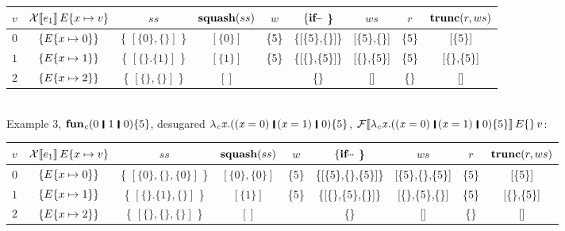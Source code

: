 \begin{tabular}{|c|c|c|c|c|c|c|c|c|}
  \hline
  $v$ & $\mathcal{X}\llbracket e_1 \rrbracket\, E\{  x \mapsto v \} $ & \mbox{ $ss$ } & $\textbf{squash}(ss)$ & $w$ & $ \{ \ensuremath{\textbf{if}} \mydots$ \} & $ws$ & $r$ & $\textbf{trunc}(r,ws)$\\
  \hline
  $0$ & $\{ E\{  x \mapsto 0  \} \}$ & \{ $[\{0\},\{\}]$ \} & $[\{0\}]$ & \{5\} & \{[\{5\},\{\}]\} & [\{5\},\{\}] & \{5\} & [\{5\}] \\
  \hline
  $1$ & $\{ E\{  x \mapsto 1  \} \}$ & \{ $[\{\}.\{1\}]$ \} & $[\{1\}]$ & \{5\} & \{[\{\},\{5\}]\} & [\{\},\{5\}] & \{5\} & [\{\},\{5\}] \\
  \hline
  $2$ & $\{ E\{  x \mapsto 2  \} \}$ & \{ $[\{\},\{\}]$ \} & $[]$ & & \{\} & [] & \{\} & [] \\
  \hline
\end{tabular} \\[4mm]

Example 3, \ensuremath{\textbf{fun}_{\Varid{c}}(\mathrm{0}\hspace{0.19em}\mathop{\rule[-0.1em]{0.15em}{0.75em}}\hspace{0.2em}\mathrm{1}\hspace{0.19em}\mathop{\rule[-0.1em]{0.15em}{0.75em}}\hspace{0.2em}\mathrm{0})\{\mathrm{5}\}}, desugared \ensuremath{\lambda_{\Varid{c}}\Varid{x}.((\Varid{x}\mathrel{=}\mathrm{0})\hspace{0.19em}\mathop{\rule[-0.1em]{0.15em}{0.75em}}\hspace{0.2em}(\Varid{x}\mathrel{=}\mathrm{1})\hspace{0.19em}\mathop{\rule[-0.1em]{0.15em}{0.75em}}\hspace{0.2em}\mathrm{0})\{\mathrm{5}\}}, $\semappp{F}{\ensuremath{\lambda_{\Varid{c}}\Varid{x}.((\Varid{x}\mathrel{=}\mathrm{0})\hspace{0.19em}\mathop{\rule[-0.1em]{0.15em}{0.75em}}\hspace{0.2em}(\Varid{x}\mathrel{=}\mathrm{1})\hspace{0.19em}\mathop{\rule[-0.1em]{0.15em}{0.75em}}\hspace{0.2em}\mathrm{0})\{\mathrm{5}\}}}{\myenv{}}{v}$:

\begin{tabular}{|c|c|c|c|c|c|c|c|c|}
  \hline
  $v$ & $\mathcal{X}\llbracket e_1 \rrbracket\, E\{  x \mapsto v \} $ & \mbox{ $ss$ } & $\textbf{squash}(ss)$ & $w$ & $ \{ \ensuremath{\textbf{if}} \mydots$ \} & $ws$ & $r$ & $\textbf{trunc}(r,ws)$\\
  \hline
  $0$ & $\{ E\{  x \mapsto 0  \} \}$ & \{ $[\{0\},\{\},\{0\}]$ \} & $[\{0\},\{0\}]$ & \{5\} & \{[\{5\},\{\},\{5\}]\} & [\{5\},\{\},\{5\}] & \{5\} & [\{5\}] \\
  \hline
  $1$ & $\{ E\{  x \mapsto 1  \} \}$ & \{ $[\{\}.\{1\},\{\}]$ \} & $[\{1\}]$ & \{5\} & \{[\{\},\{5\},\{\}]\} & [\{\},\{5\},\{\}] & \{5\} & [\{\},\{5\}] \\
  \hline
  $2$ & $\{ E\{  x \mapsto 2  \} \}$ & \{ $[\{\},\{\},\{\}]$ \} & $[]$ & & \{\} & [] & \{\} & [] \\
  \hline
\end{tabular} \\[4mm]

